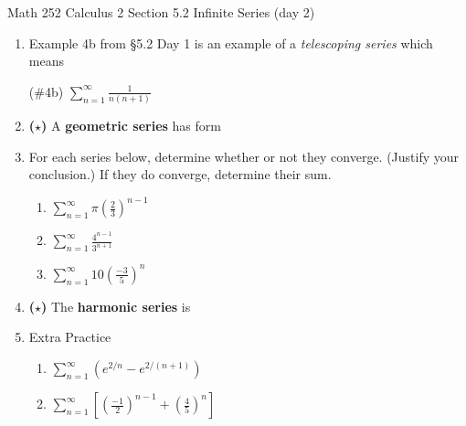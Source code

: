 \documentclass[11pt,fleqn]{article}
\begin{document}
\renewcommand{\headrulewidth}{0pt}
\newcommand{\blank}[1]{\rule{#1}{0.75pt}}
\newcommand{\bc}{\begin{center}}
\newcommand{\ec}{\end{center}}

 \noindent Math 252 Calculus 2 \hfill Section 5.2 Infinite Series (day 2)

\normalsize

\begin{enumerate}
\item Example 4b from \S 5.2 Day 1 is an example of a \emph{telescoping series} which means \\
\bigskip

(\#4b) $\displaystyle \sum_{n=1}^\infty \frac{1}{n(n+1)}$
\vfill


\item {\Large\textbf{($\star$)}} A \textbf{geometric series} has form 

\vspace{2in}

\vfill

\item For each series below, determine whether or not they converge. (Justify your conclusion.) If they do converge, determine their sum.
	\begin{enumerate}
	\item $\displaystyle \sum_{n=1}^\infty \pi \left( \frac{2}{3} \right)^{n-1}$

	\vfill

	\item  $\displaystyle \sum_{n=1}^\infty  \frac{4^{n-1}}{3^{n+1}} $

	\vfill
	\newpage
	\item $\displaystyle \sum_{n=1}^\infty 10\left(\frac{-3}{5} \right)^n$
	\vfill
	\end{enumerate}


\item {\Large\textbf{($\star$)}} The \textbf{harmonic series} is

\vfill

\vfill

\item Extra Practice	
	\begin{enumerate}
	\item $\displaystyle \sum_{n=1}^\infty  (e^{2/n} - e^{2/(n+1)} )$
	\vfill
	\item $\displaystyle \sum_{n=1}^\infty \left[ \left(\frac{-1}{2} \right)^{n-1} + \left(\frac{4}{5} \right)^n \right] $
	\vfill
	\end{enumerate}

\end{enumerate}
\end{document}
